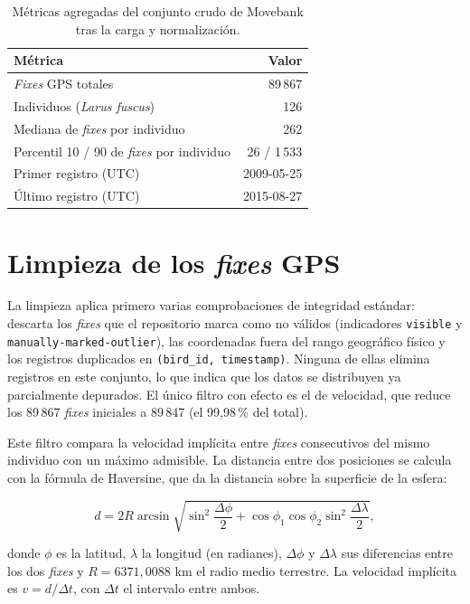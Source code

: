 \begin{table}[H]
  \centering
  \caption[Caracterización del conjunto crudo]{Métricas agregadas del conjunto
  crudo de Movebank tras la carga y normalización.}
  \label{tab:o1-overview}
  \begin{tabular}{lr}
    \toprule
    \textbf{Métrica} & \textbf{Valor} \\
    \midrule
    \textit{Fixes} GPS totales & 89\,867 \\
    Individuos (\textit{Larus fuscus}) & 126 \\
    Mediana de \textit{fixes} por individuo & 262 \\
    Percentil 10 / 90 de \textit{fixes} por individuo & 26 / 1\,533 \\
    Primer registro (UTC) & 2009-05-25 \\
    Último registro (UTC) & 2015-08-27 \\
    \bottomrule
  \end{tabular}
\end{table}

\section{Limpieza de los \textit{fixes} GPS}
\label{sec:o1-limpieza}

La limpieza aplica primero varias comprobaciones de integridad estándar: descarta
los \textit{fixes} que el repositorio marca como no válidos (indicadores
\texttt{visible} y \texttt{manually-marked-outlier}), las coordenadas fuera del
rango geográfico físico y los registros duplicados en
\texttt{(bird\_id, timestamp)}. Ninguna de ellas elimina registros en este
conjunto, lo que indica que los datos se distribuyen ya parcialmente depurados. El
único filtro con efecto es el de velocidad, que reduce los 89\,867 \textit{fixes}
iniciales a 89\,847 (el 99,98\,\% del total).

Este filtro compara la velocidad implícita entre \textit{fixes} consecutivos del
mismo individuo con un máximo admisible. La
distancia entre dos posiciones se calcula con la fórmula de Haversine, que da la
distancia sobre la superficie de la esfera:

\begin{equation}
  d = 2R \arcsin\sqrt{\sin^2\!\frac{\Delta\phi}{2}
      + \cos\phi_1 \cos\phi_2 \sin^2\!\frac{\Delta\lambda}{2}},
  \label{eq:haversine}
\end{equation}

donde $\phi$ es la latitud, $\lambda$ la longitud (en radianes), $\Delta\phi$ y
$\Delta\lambda$ sus diferencias entre los dos \textit{fixes} y
$R = 6371{,}0088$ km el radio medio terrestre. La velocidad implícita es
$v = d/\Delta t$, con $\Delta t$ el intervalo entre ambos.

